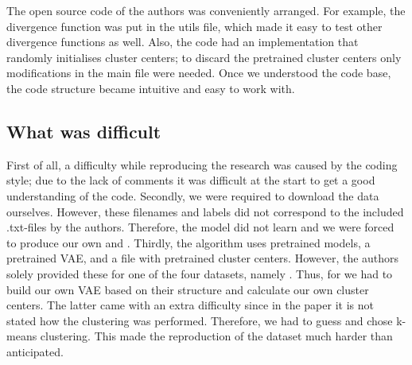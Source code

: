 
The open source code of the authors was conveniently arranged. For example, the divergence function was put in the utils file, which made it easy to test other divergence functions as well. Also, the code had an implementation that randomly initialises cluster centers; to discard the pretrained cluster centers only modifications in the main file were needed. Once we understood the code base, the code structure became intuitive and easy to work with. 

\subsection{What was difficult}



First of all, a difficulty while reproducing the research was caused by the coding style; due to the lack of comments it was difficult at the start to get a good understanding of the code. Secondly, we were required to download the data ourselves. However, these filenames and labels did not correspond to the included .txt-files by the authors. Therefore, the model did not learn and we were forced to produce our own  and . Thirdly, the algorithm uses pretrained models, a pretrained VAE, and a file with pretrained cluster centers. However, the authors solely provided these for one of the four datasets, namely \USPSMNIST. Thus, for \revMNIST we had to build our own VAE based on their structure and calculate our own cluster centers. The latter came with an extra difficulty since in the paper it is not stated how the clustering was performed. Therefore, we had to guess and chose k-means clustering. This made the reproduction of the \revMNIST dataset much harder than anticipated.

